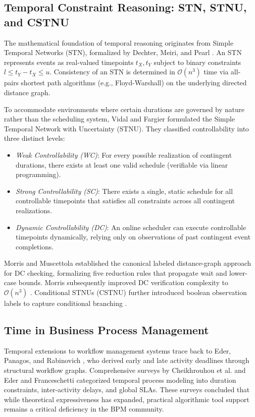 \documentclass[conference]{IEEEtran}
\begin{document}
\subsection{Temporal Constraint Reasoning: STN, STNU, and CSTNU}
The mathematical foundation of temporal reasoning originates from Simple Temporal Networks (STN), formalized by Dechter, Meiri, and Pearl \cite{dechter1991}. An STN represents events as real-valued timepoints $t_X, t_Y$ subject to binary constraints $l \leq t_Y - t_X \leq u$. Consistency of an STN is determined in $\mathcal{O}(n^3)$ time via all-pairs shortest path algorithms (e.g., Floyd-Warshall) on the underlying directed distance graph.

To accommodate environments where certain durations are governed by nature rather than the scheduling system, Vidal and Fargier \cite{vidal1999} formulated the Simple Temporal Network with Uncertainty (STNU). They classified controllability into three distinct levels:
\begin{itemize}
    \item \textit{Weak Controllability (WC)}: For every possible realization of contingent durations, there exists at least one valid schedule (verifiable via linear programming).
    \item \textit{Strong Controllability (SC)}: There exists a single, static schedule for all controllable timepoints that satisfies all constraints across all contingent realizations.
    \item \textit{Dynamic Controllability (DC)}: An online scheduler can execute controllable timepoints dynamically, relying only on observations of past contingent event completions.
\end{itemize}

Morris and Muscettola \cite{morris2005} established the canonical labeled distance-graph approach for DC checking, formalizing five reduction rules that propagate wait and lower-case bounds. Morris subsequently improved DC verification complexity to $\mathcal{O}(n^3)$ \cite{morris2014}. Conditional STNUs (CSTNU) further introduced boolean observation labels to capture conditional branching \cite{posenato2022}.

\subsection{Time in Business Process Management}
Temporal extensions to workflow management systems trace back to Eder, Panagos, and Rabinovich \cite{eder1999}, who derived early and late activity deadlines through structural workflow graphs. Comprehensive surveys by Cheikhrouhou et al. \cite{cheikhrouhou2015} and Eder and Franceschetti \cite{eder2020} categorized temporal process modeling into duration constraints, inter-activity delays, and global SLAs. These surveys concluded that while theoretical expressiveness has expanded, practical algorithmic tool support remains a critical deficiency in the BPM community.
\end{document}
